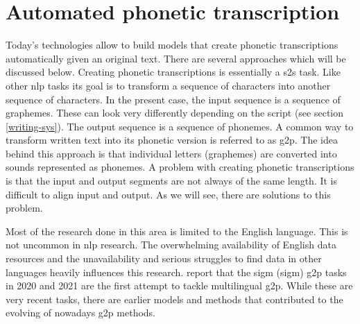 

\section{Automated phonetic transcription}
Today's technologies allow to build models that create phonetic transcriptions automatically given an original text. There are several approaches which will be discussed below. Creating phonetic transcriptions is essentially a \ac{s2s} task. Like other \ac{nlp} tasks its goal is to transform a sequence of characters into another sequence of characters. In the present case, the input sequence is a sequence of graphemes. These can look very differently depending on the script (see section \ref{writing-sys}). The output sequence is a sequence of phonemes. A common way to transform written text into its phonetic version is referred to as \ac{g2p}. The idea behind this approach is that individual letters (graphemes) are converted into sounds represented as phonemes. A problem with creating phonetic transcriptions is that the input and output segments are not always of the same length. It is difficult to align input and output. As we will see, there are solutions to this problem.  

Most of the research done in this area is limited to the English language. This is not uncommon in \ac{nlp} research. The overwhelming availability of English data resources and the unavailability and serious struggles to find data in other languages heavily influences this research. \citet{Ashby&Bartley.2021} report that the \acs{sigm} (\acl{sigm}) \ac{g2p} tasks in 2020 and 2021 are the first attempt to tackle multilingual \ac{g2p}. While these are very recent tasks, there are earlier models and methods that contributed to the evolving of nowadays \ac{g2p} methods.


